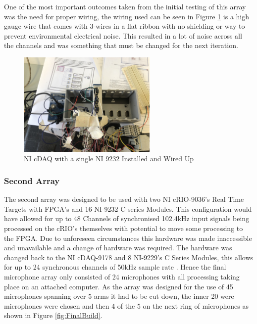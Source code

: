 \documentclass{UoNMCHA}
\numberwithin{equation}{section}
\begin{document}
    One of the most important outcomes taken from the initial testing of this array was the need for proper wiring, the wiring used can be seen in Figure \ref{fig:TestSetup} is a high gauge wire that comes with 3-wires in a flat ribbon with no shielding or way to prevent environmental electrical noise. This resulted in a lot of noise across all the channels and was something that must be changed for the next iteration.

    \begin{figure} [H]
        \centering
        \includegraphics[keepaspectratio, width = 0.6\textwidth]{Figures/cDAQ.jpg}
        \caption{NI cDAQ with a single NI 9232 Installed and Wired Up}
        \label{fig:TestSetup}
    \end{figure}

\subsubsection{Second Array} \label{sec:Second Design DAQ}
    The second array was designed to be used with two NI cRIO-9036's Real Time Targets with FPGA's and 16 NI-9232 C-series Modules. This configuration would have allowed for up to 48 Channels of synchronised 102.4kHz input signals being processed on the cRIO's themselves with potential to move some processing to the FPGA. Due to unforeseen circumstances this hardware was made inaccessible and unavailable and a change of hardware was required. The hardware was changed back to the NI cDAQ-9178 and 8 NI-9229's C Series Modules, this allows for up to 24 synchronous channels of 50kHz sample rate \citep{NI9229}. Hence the final microphone array only consisted of 24 microphones with all processing taking place on an attached computer. As the array was designed for the use of 45 microphones spanning over 5 arms it had to be cut down, the inner 20 were microphones were chosen and then 4 of the 5 on the next ring of microphones as shown in Figure \ref{fig:FinalBuild}.
    
\end{document}
